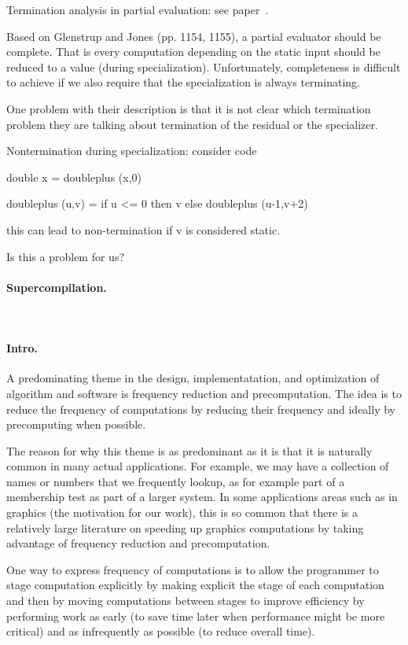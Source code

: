 Termination analysis in partial evaluation: see paper~\cite{AH96,GJ05}.

Based on Glenstrup and Jones (pp. 1154, 1155), a partial evaluator
should be complete. That is every computation depending on the static
input should be reduced to a value (during specialization).
Unfortunately, completeness is difficult to achieve if we also require
that the specialization is always terminating.

One problem with their description is that it is not clear which
termination problem they are talking about termination of the residual
or the specializer. 

Nontermination during specialization: 
consider code

double x = doubleplus (x,0) 

doubleplus (u,v) = if u <= 0 then v else doubleplus (u-1,v+2)

this can lead to non-termination if v is considered static.  

Is this a problem for us? 



\paragraph{Supercompilation.}
~\cite{Turchin86}


\paragraph{Intro.}

A predominating theme in the design, implementatation, and
optimization of algorithm and software is frequency reduction and
precomputation.  The idea is to reduce the frequency of computations
by reducing their frequency and ideally by precomputing when possible.


The reason for why this theme is as predominant as it is that it is
naturally common in many actual applications.  For example, we may
have a collection of names or numbers that we frequently lookup, as
for example part of a membership test as part of a larger system.  In
some applications areas such as in graphics (the motivation for our
work), this is so common that there is a relatively large literature
on speeding up graphics computations by taking advantage of frequency
reduction and precomputation.

One way to express frequency of computations is to allow the
programmer to stage computation explicitly by making explicit the
stage of each computation and then by moving computations between
stages to improve efficiency by performing work as early (to save time
later when performance might be more critical) and  as infrequently
as possible (to reduce overall time).






